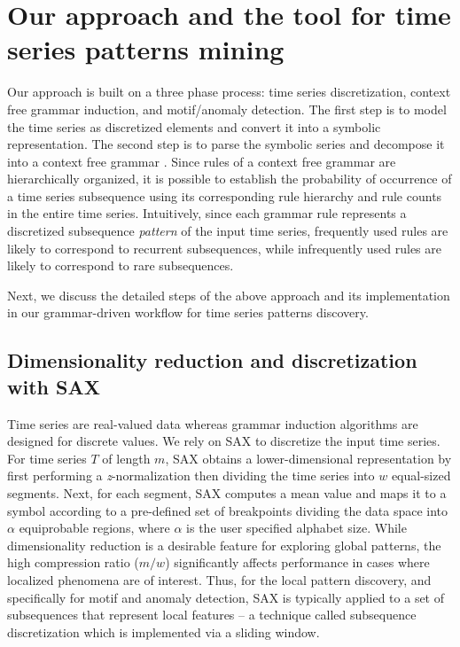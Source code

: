 \documentclass{llncs}
\begin{document}
\section{Our approach and the tool for time series patterns mining}
Our approach is built on a three phase process: time series discretization, context free grammar induction, and motif/anomaly detection. The first step is to model the time series as discretized elements and convert it into a symbolic representation. The second step is to parse the symbolic series and decompose it into a context free grammar \cite{grammarviz, SAXSequitur14}. Since rules of a context free grammar are hierarchically organized, it is possible to establish the probability of occurrence of a time series subsequence using its corresponding rule hierarchy and rule counts in the entire time series. Intuitively, since each grammar rule represents a discretized subsequence \textit{pattern} of the input time series, frequently used rules are likely to correspond to recurrent subsequences, while infrequently used rules are likely to correspond to rare subsequences. 

Next, we discuss the detailed steps of the above approach and its implementation in our grammar-driven workflow for time series patterns discovery.

\subsection{Dimensionality reduction and discretization with SAX}
Time series are real-valued data whereas grammar induction algorithms are designed for discrete values. We rely on SAX \cite{sax} to discretize the input time series. For time series $T$ of length $m$, SAX obtains a lower-dimensional representation by first performing a \textit{z}-normalization then dividing the time series into $w$ equal-sized segments. Next, for each segment, SAX computes a mean value and maps it to a symbol according to a pre-defined set of breakpoints dividing the data space into $\alpha$ equiprobable regions, where $\alpha$ is the user specified alphabet size. While dimensionality reduction is a desirable feature for exploring global patterns, the high compression ratio ($m/w$) significantly affects performance in cases where localized phenomena are of interest. Thus, for the local pattern discovery, and specifically for motif and anomaly detection, SAX is typically applied to a set of subsequences that represent local features -- a technique called subsequence discretization \cite{lin_motifs} which is implemented via a sliding window. 
\end{document}
